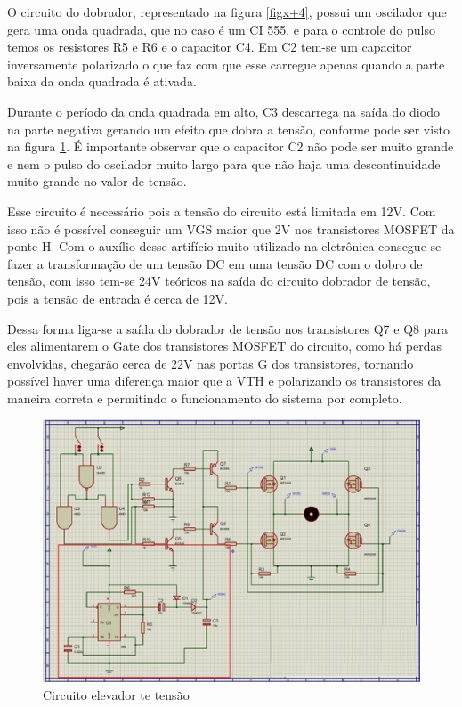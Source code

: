 O circuito do dobrador, representado na figura \ref{figx+4}, possui um oscilador que gera uma onda quadrada, que no caso é um CI 555, e para o controle do pulso temos os resistores R5 e R6 e o capacitor C4. Em C2 tem-se um capacitor inversamente polarizado o que faz com que esse carregue apenas quando a parte baixa da onda quadrada é ativada.

Durante o período da onda quadrada em alto, C3 descarrega na saída do diodo na parte negativa gerando um efeito que dobra a tensão, conforme pode ser visto na figura \ref{fig:figx+4}. É importante observar que o capacitor C2 não pode ser muito grande e nem o pulso do oscilador muito largo para que não haja uma descontinuidade muito grande no valor de tensão.

Esse circuito é necessário pois a tensão do circuito está limitada em 12V. Com isso não é possível conseguir um VGS maior que 2V nos transistores MOSFET da ponte H. Com o auxílio desse artifício muito utilizado na eletrônica consegue-se fazer a transformação de um tensão DC em uma tensão DC com o dobro de tensão, com isso tem-se 24V teóricos na saída do circuito dobrador de tensão, pois a tensão de entrada é cerca de 12V.

Dessa forma liga-se a saída do dobrador de tensão nos transistores Q7 e Q8 para eles alimentarem o Gate dos transistores MOSFET do circuito, como há perdas envolvidas, chegarão cerca de 22V nas portas G dos transistores, tornando possível haver uma diferença maior que a VTH e polarizando os transistores da maneira correta e permitindo o funcionamento do sistema por completo.

\begin{figure}[!htb]
	\centering
	\includegraphics[keepaspectratio=true,scale=0.8]{figuras/referencialteorico/figurax_4.eps}
	\caption{Circuito elevador te tensão}
	\label{fig:figx+4}
\end{figure}


